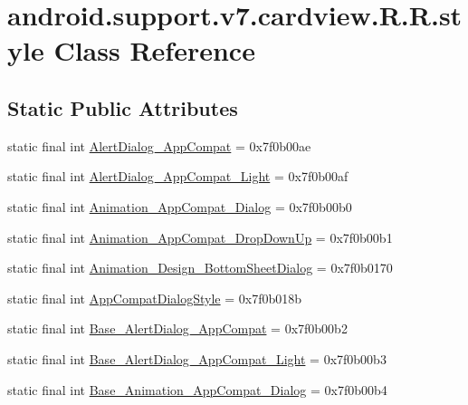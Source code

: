 \hypertarget{classandroid_1_1support_1_1v7_1_1cardview_1_1_r_1_1style}{
\section{android.support.v7.cardview.R.R.style Class Reference}
\label{classandroid_1_1support_1_1v7_1_1cardview_1_1_r_1_1style}
}
\subsection*{Static Public Attributes}
\begin{CompactItemize}
\item 
static final int \hyperlink{classandroid_1_1support_1_1v7_1_1cardview_1_1_r_1_1style_e154a913e2c93379714bc874303cddad}{AlertDialog\_\-AppCompat} = 0x7f0b00ae
\item 
static final int \hyperlink{classandroid_1_1support_1_1v7_1_1cardview_1_1_r_1_1style_a42fff32767ab879ed5539ab9f8c8c71}{AlertDialog\_\-AppCompat\_\-Light} = 0x7f0b00af
\item 
static final int \hyperlink{classandroid_1_1support_1_1v7_1_1cardview_1_1_r_1_1style_2aeeeef808b9deb6b9275e94398706e6}{Animation\_\-AppCompat\_\-Dialog} = 0x7f0b00b0
\item 
static final int \hyperlink{classandroid_1_1support_1_1v7_1_1cardview_1_1_r_1_1style_a25fb2a519c652a919ce4de3a5cd04ae}{Animation\_\-AppCompat\_\-DropDownUp} = 0x7f0b00b1
\item 
static final int \hyperlink{classandroid_1_1support_1_1v7_1_1cardview_1_1_r_1_1style_bfa258d0446ba8dff59611ea3359e480}{Animation\_\-Design\_\-BottomSheetDialog} = 0x7f0b0170
\item 
static final int \hyperlink{classandroid_1_1support_1_1v7_1_1cardview_1_1_r_1_1style_1477eb10d78ae2c6e4cebcb1c770ea3b}{AppCompatDialogStyle} = 0x7f0b018b
\item 
static final int \hyperlink{classandroid_1_1support_1_1v7_1_1cardview_1_1_r_1_1style_19ead5e64111beab324a890c83f04add}{Base\_\-AlertDialog\_\-AppCompat} = 0x7f0b00b2
\item 
static final int \hyperlink{classandroid_1_1support_1_1v7_1_1cardview_1_1_r_1_1style_2097ddfa5ec2b07aaaa674bc1c738df5}{Base\_\-AlertDialog\_\-AppCompat\_\-Light} = 0x7f0b00b3
\item 
static final int \hyperlink{classandroid_1_1support_1_1v7_1_1cardview_1_1_r_1_1style_a3618f9792f7c238f67ec4ae7bcdc85a}{Base\_\-Animation\_\-AppCompat\_\-Dialog} = 0x7f0b00b4

\end{CompactItemize}
